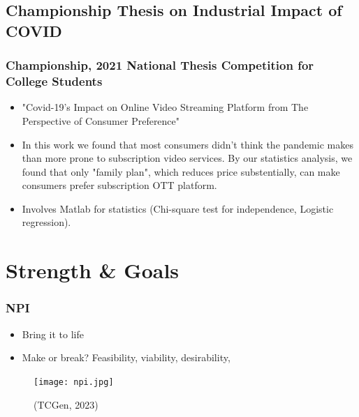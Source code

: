 \documentclass[compress, aspectratio=32]{beamer}
\begin{document}
\subsection{Championship Thesis on Industrial Impact of COVID}
\begin{frame}
    \frametitle{Championship, 2021 National Thesis Competition for College Students}
    \begin{itemize}
        \item "Covid-19's Impact on Online Video Streaming Platform from The Perspective of Consumer Preference"
        \item In this work we found that most consumers didn't think the pandemic makes than more prone to subscription video services. By our statistics analysis, we found that only "family plan", which reduces price substentially, can make consumers prefer subscription OTT platform.
        \item Involves Matlab for statistics (Chi-square test for independence,
              Logistic regression).
    \end{itemize}
\end{frame}




\section{Strength \& Goals}
\begin{frame}
    \frametitle{NPI}
            \begin{itemize}
                \item Bring it to life
                \item Make or break?
                     Feasibility,
                     viability,
                     desirability,
            \end{itemize}
            \begin{figure}
        \centering
        \texttt{[image: npi.jpg]}
        \caption{(TCGen, 2023)}
    \end{figure}
    
\end{frame}
\end{document}
